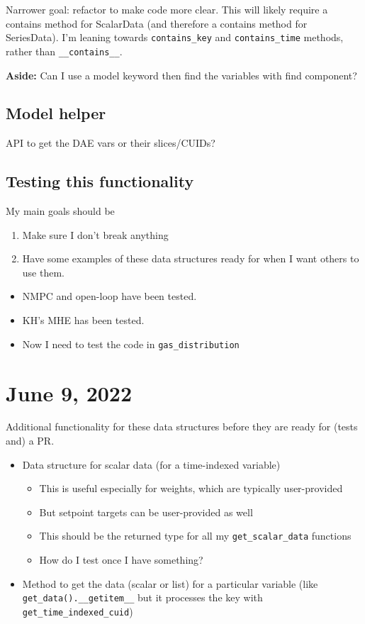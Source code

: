 \documentclass{article}
\begin{document}
Narrower goal: refactor to make code more clear.
This will likely require a contains method for ScalarData
(and therefore a contains method for SeriesData).
I'm leaning towards \texttt{contains\_key}
and \texttt{contains\_time} methods, rather than
\texttt{\_\_contains\_\_}.

\medskip

{\bf Aside:} Can I use a model keyword then find the variables
with find component?

\subsection{Model helper}
API to get the DAE vars or their slices/CUIDs?

\subsection{Testing this functionality}
My main goals should be
\begin{enumerate}
  \item Make sure I don't break anything
  \item Have some examples of these data structures ready for when I want
    others to use them.
\end{enumerate}

\begin{itemize}
  \item NMPC and open-loop have been tested.
  \item KH's MHE has been tested.
  \item Now I need to test the code in \texttt{gas\_distribution}
\end{itemize}

\section{June 9, 2022}
Additional functionality for these data structures before they are
ready for (tests and) a PR.
\begin{itemize}
  \item Data structure for scalar data (for a time-indexed variable)
    \begin{itemize}
      \item This is useful especially for weights, which are typically
	user-provided
      \item But setpoint targets can be user-provided as well
      \item This should be the returned type for all my
	\texttt{get\_scalar\_data} functions
      \item How do I test once I have something?
    \end{itemize}
  \item Method to get the data (scalar or list) for a particular
    variable (like \texttt{get\_data().\_\_getitem\_\_} but it processes
    the key with \texttt{get\_time\_indexed\_cuid})
\end{itemize}
\end{document}

